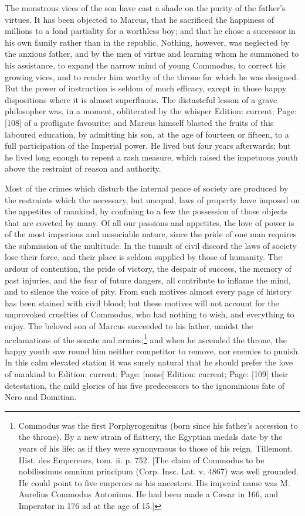 The monstrous vices of the son have cast a shade on the purity of the father\texthebrew{}’s virtues. It has been objected to Marcus, that he sacrificed the happiness of millions to a fond partiality for a worthless boy; and that he chose a successor in his own family rather than in the republic. Nothing, however, was neglected by the anxious father, and by the men of virtue and learning whom he summoned to his assistance, to expand the narrow mind of young Commodus, to correct his growing vices, and to render him worthy of the throne for which he was designed. But the power of instruction is seldom of much efficacy, except in those happy dispositions where it is almost superfluous. The distasteful lesson of a grave philosopher was, in a moment, obliterated by the whisper Edition: current; Page: [108] of a profligate favourite; and Marcus himself blasted the fruits of this laboured education, by admitting his son, at the age of fourteen or fifteen, to a full participation of the Imperial power. He lived but four years afterwards; but he lived long enough to repent a rash measure, which raised the impetuous youth above the restraint of reason and authority.

Most of the crimes which disturb the internal peace of society are produced by the restraints which the necessary, but unequal, laws of property have imposed on the appetites of mankind, by confining to a few the possession of those objects that are coveted by many. Of all our passions and appetites, the love of power is of the most imperious and unsociable nature, since the pride of one man requires the submission of the multitude. In the tumult of civil discord the laws of society lose their force, and their place is seldom supplied by those of humanity. The ardour of contention, the pride of victory, the despair of success, the memory of past injuries, and the fear of future dangers, all contribute to inflame the mind, and to silence the voice of pity. From such motives almost every page of history has been stained with civil blood; but these motives will not account for the unprovoked cruelties of Commodus, who had nothing to wish, and everything to enjoy. The beloved son of Marcus succeeded to his father, amidst the acclamations of the senate and armies;\footnote{Commodus was the first Porphyrogenitus (born since his father\texthebrew{}’s accession to the throne). By a new strain of flattery, the Egyptian medals date by the years of his life; as if they were synonymous to those of his reign. Tillemont. Hist. des Empereurs, tom. ii. p. 752. [The claim of Commodus to be nobilissimus omnium principum (Corp. Insc. Lat. v. 4867) was well grounded. He could point to five emperors as his ancestors. His imperial name was M. Aurelius Commodus Antoninus. He had been made a Cæsar in 166, and Imperator in 176 ad at the age of 15.]} and when he ascended the throne, the happy youth saw round him neither competitor to remove, nor enemies to punish. In this calm elevated station it was surely natural that he should prefer the love of mankind to Edition: current; Page: [none] Edition: current; Page: [109] their detestation, the mild glories of his five predecessors to the ignominious fate of Nero and Domitian.

